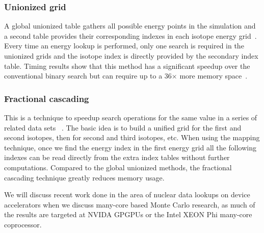 \subsubsection*{ \textbf{Unionized grid} } A global unionized table gathers all possible energy points in the simulation and a second table provides their corresponding indexes in each isotope energy grid~\cite{leppanen2009two}. Every time an energy lookup is performed, only one search is required in the unionized grids and the isotope index is directly provided by the secondary index table. Timing results show that this method has a significant speedup over the conventional binary search but can require up to a 36$\times$ more memory space~\cite{a.l.lunda.r.siegel2015}.
%
\subsubsection*{ \textbf{Fractional cascading} } This is a technique to speedup search operations for the same value in a series of related data sets ~\cite{a.l.lunda.r.siegel2015}. The basic idea is to build a unified grid for the first and second isotopes, then for second and third isotopes, etc. When using the mapping technique, once we find the energy index in the first energy grid all the following indexes can be read directly from the extra index tables without further computations. Compared to the global unionized methods, the fractional cascading technique greatly reduces memory usage.

%
We will discuss recent work done in the area of nuclear data lookups on device accelerators when we discuss many-core based Monte Carlo research, as much of the results are targeted at NVIDA GPGPUs or the Intel XEON Phi many-core coprocessor. 
